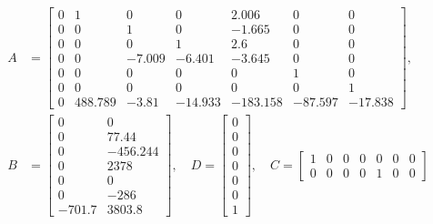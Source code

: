 \documentclass[11pt,letterpaper,twoside,openright]{report}
\begin{document}
\begin{equation}
	\begin{split}
		A &=\begin{bmatrix} 
		0 & 1 & 0 & 0 & 2.006 & 0 & 0 \\
		0 & 0 & 1 & 0 & -1.665 & 0 & 0 \\
		0 & 0 & 0 & 1 & 2.6 & 0 & 0 \\
		0 & 0 & -7.009 & -6.401 & -3.645 & 0 & 0 \\
		0 & 0 & 0 & 0 & 0 & 1 &     0 \\
		0 & 0 & 0 & 0 & 0  &  0  &  1 \\
		0 & 488.789 &  -3.81 & -14.933 & -183.158 & -87.597 & -17.838
		\end{bmatrix}, \\
		B &=\begin{bmatrix} 
		0 &	0 \\
		0 &	77.44 \\
		0 &	-456.244 \\
		0 &	2378 \\
		0 &	0 \\
		0 &	-286 \\
		-701.7 &	3803.8
		\end{bmatrix}, \quad 
		D =\begin{bmatrix}
			0 \\
			0 \\
			0 \\
			0 \\
			0 \\
			0 \\
			1
		\end{bmatrix}, \quad
		C =\begin{bmatrix}
			1 & 0 & 0 & 0 & 0 & 0 & 0 \\
			0 & 0 & 0 & 0 & 1 & 0 & 0
		\end{bmatrix}
	\end{split}
\end{equation}
\end{document}
